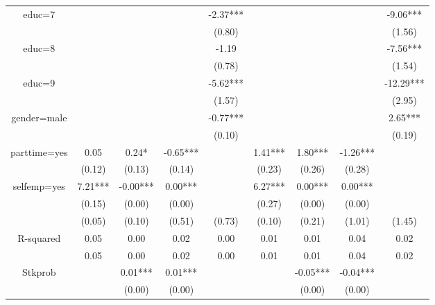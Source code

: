 \begin{table}[ht]
\begin{adjustbox}{width={0.9\textwidth},totalheight={\textheight}}
\begin{threeparttable}
\begin{tabular}{ccccccccc}
educ=7       &          &           &            &    -2.37*** &           &            &             &     -9.06*** \\
             &          &           &            &      (0.80) &           &            &             &       (1.56) \\
educ=8       &          &           &            &       -1.19 &           &            &             &     -7.56*** \\
             &          &           &            &      (0.78) &           &            &             &       (1.54) \\
educ=9       &          &           &            &    -5.62*** &           &            &             &    -12.29*** \\
             &          &           &            &      (1.57) &           &            &             &       (2.95) \\
gender=male  &          &           &            &    -0.77*** &           &            &             &      2.65*** \\
             &          &           &            &      (0.10) &           &            &             &       (0.19) \\
parttime=yes &     0.05 &     0.24* &   -0.65*** &             &   1.41*** &    1.80*** &    -1.26*** &              \\
             &   (0.12) &    (0.13) &     (0.14) &             &    (0.23) &     (0.26) &      (0.28) &              \\
selfemp=yes  &  7.21*** &  -0.00*** &    0.00*** &             &   6.27*** &    0.00*** &     0.00*** &              \\
             &   (0.15) &    (0.00) &     (0.00) &             &    (0.27) &     (0.00) &      (0.00) &              \\
             &   (0.05) &    (0.10) &     (0.51) &      (0.73) &    (0.10) &     (0.21) &      (1.01) &       (1.45) \\
R-squared    &     0.05 &      0.00 &       0.02 &        0.00 &      0.01 &       0.01 &        0.04 &         0.02 \\
             &     0.05 &      0.00 &       0.02 &        0.00 &      0.01 &       0.01 &        0.04 &         0.02 \\
Stkprob      &          &   0.01*** &    0.01*** &             &           &   -0.05*** &    -0.04*** &              \\
             &          &    (0.00) &     (0.00) &             &           &     (0.00) &      (0.00) &              \\

\end{tabular}
\end{threeparttable}
\end{adjustbox}
\end{table}
